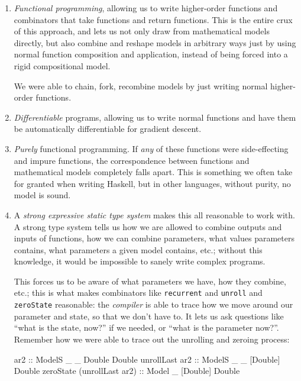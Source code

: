 \documentclass[]{article}
\newenvironment{Shaded}{}{}
\newcommand{\DataTypeTok}[1]{\textcolor[rgb]{0.56,0.13,0.00}{#1}}
\newcommand{\NormalTok}[1]{#1}
\newcommand{\OtherTok}[1]{\textcolor[rgb]{0.00,0.44,0.13}{#1}}
\begin{document}
\begin{enumerate}
\def\labelenumi{\arabic{enumi}.}
\item
  \emph{Functional programming}, allowing us to write higher-order functions and
  combinators that take functions and return functions. This is the entire crux
  of this approach, and lets us not only draw from mathematical models directly,
  but also combine and reshape models in arbitrary ways just by using normal
  function composition and application, instead of being forced into a rigid
  compositional model.

  We were able to chain, fork, recombine models by just writing normal
  higher-order functions.
\item
  \emph{Differentiable} programs, allowing us to write normal functions and have
  them be automatically differentiable for gradient descent.
\item
  \emph{Purely} functional programming. If \emph{any} of these functions were
  side-effecting and impure functions, the correspondence between functions and
  mathematical models completely falls apart. This is something we often take
  for granted when writing Haskell, but in other languages, without purity, no
  model is sound.
\item
  A \emph{strong expressive static type system} makes this all reasonable to
  work with. A strong type system tells us how we are allowed to combine outputs
  and inputs of functions, how we can combine parameters, what values parameters
  contains, what parameters a given model contains, etc.; without this
  knowledge, it would be impossible to sanely write complex programs.

  This forces us to be aware of what parameters we have, how they combine, etc.;
  this is what makes combinators like \texttt{recurrent} and \texttt{unroll} and
  \texttt{zeroState} reasonable: the \emph{compiler} is able to trace how we
  move around our parameter and state, so that we don't have to. It lets us ask
  questions like ``what is the state, now?'' if we needed, or ``what is the
  parameter now?''. Remember how we were able to trace out the unrolling and
  zeroing process:

\begin{Shaded}
\begin{Highlighting}[]
\OtherTok{ar2                        ::} \DataTypeTok{ModelS}\NormalTok{ _ _  }\DataTypeTok{Double}  \DataTypeTok{Double}
\NormalTok{unrollLast}\OtherTok{ ar2             ::} \DataTypeTok{ModelS}\NormalTok{ _ _ [}\DataTypeTok{Double}\NormalTok{] }\DataTypeTok{Double}
\NormalTok{zeroState (unrollLast ar2)}\OtherTok{ ::} \DataTypeTok{Model}\NormalTok{  _   [}\DataTypeTok{Double}\NormalTok{] }\DataTypeTok{Double}
\end{Highlighting}
\end{Shaded}


\end{enumerate}
\end{document}
